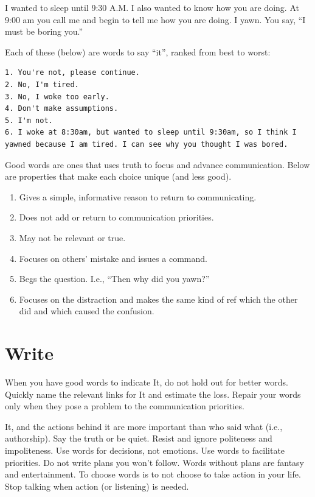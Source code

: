 \documentclass[
]{book}
\providecommand{\tightlist}{%
  \setlength{\itemsep}{0pt}\setlength{\parskip}{0pt}}
\begin{document}
I wanted to sleep until 9:30 A.M.
I also wanted to know how you are doing.
At 9:00 am you call me and begin to tell me how you are doing.
I yawn.
You say, ``I must be boring you.''

Each of these (below) are words to say ``it'', ranked from best to worst:

\begin{verbatim}
1. You're not, please continue.  
2. No, I'm tired.  
3. No, I woke too early.  
4. Don't make assumptions.  
5. I'm not.  
6. I woke at 8:30am, but wanted to sleep until 9:30am, so I think I yawned because I am tired. I can see why you thought I was bored.   
\end{verbatim}

Good words are ones that uses truth to focus and advance communication.
Below are properties that make each choice unique (and less good).

\begin{enumerate}
\def\labelenumi{\arabic{enumi}.}
\tightlist
\item
  Gives a simple, informative reason to return to communicating.
\item
  Does not add or return to communication priorities.
\item
  May not be relevant or true.
\item
  Focuses on others' mistake and issues a command.
\item
  Begs the question. I.e., ``Then why did you yawn?''
\item
  Focuses on the distraction and makes the same kind of ref which the other did and which caused the confusion.
\end{enumerate}

\section{Write}\label{word-write}

When you have good words to indicate It, do not hold out for better words.
Quickly name the relevant links for It and estimate the loss.
Repair your words only when they pose a problem to the communication priorities.

It, and the actions behind it are more important than who said what (i.e., authorship).
Say the truth or be quiet.
Resist and ignore politeness and impoliteness.
Use words for decisions, not emotions.
Use words to facilitate priorities.
Do not write plans you won't follow.
Words without plans are fantasy and entertainment.
To choose words is to not choose to take action in your life.
Stop talking when action (or listening) is needed.
\end{document}
